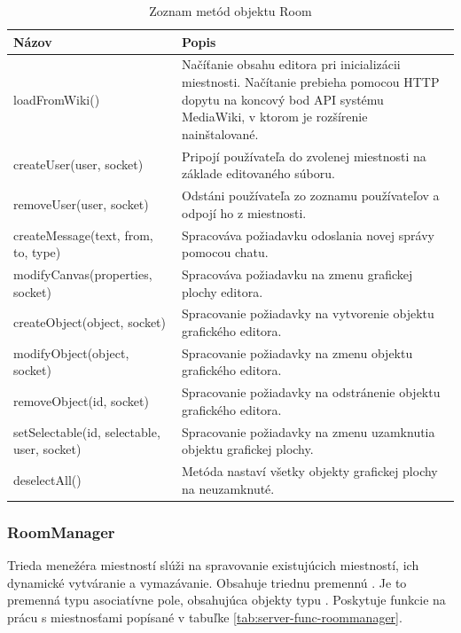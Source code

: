 \begin{table}
	\begin{tabular}{ | m{6cm} | m{6.5cm} | } \hline
		\textbf{Názov} & \textbf{Popis} \\ \hline
		
		loadFromWiki() & Načíťanie obsahu editora pri inicializácii miestnosti. Načítanie prebieha pomocou HTTP dopytu na koncový bod API systému MediaWiki, v ktorom je rozšírenie nainštalované. \\\hline
		createUser(user, socket) & Pripojí používateľa do zvolenej miestnosti na základe editovaného súboru. \\\hline
		removeUser(user, socket) & Odstáni používateľa zo zoznamu používateľov a odpojí ho z miestnosti.  \\\hline
		createMessage(text, from, to, type) & Spracováva požiadavku odoslania novej správy pomocou chatu. \\\hline
		modifyCanvas(properties, socket) & Spracováva požiadavku na zmenu grafickej plochy editora. \\\hline
		createObject(object, socket) & Spracovanie požiadavky na vytvorenie objektu grafického editora. \\\hline
		modifyObject(object, socket) & Spracovanie požiadavky na zmenu objektu grafického editora. \\\hline
		removeObject(id, socket) & Spracovanie požiadavky na odstránenie objektu grafického editora. \\\hline
		setSelectable(id, selectable, user, socket) & Spracovanie požiadavky na zmenu uzamknutia objektu grafickej plochy. \\\hline
		deselectAll() & Metóda nastaví všetky objekty grafickej plochy na neuzamknuté. \\\hline
		
		\hline
	\end{tabular}
	\caption{Zoznam metód objektu Room}
	\label{tab:server-func-room}
\end{table}


\subsubsection{RoomManager}
Trieda menežéra miestností  slúži na spravovanie existujúcich miestností, ich dynamické vytváranie a vymazávanie. Obsahuje triednu premennú . Je to premenná typu asociatívne pole, obsahujúca objekty typu . Poskytuje funkcie na prácu s miestnosťami popísané v tabuľke \ref{tab:server-func-roommanager}.

